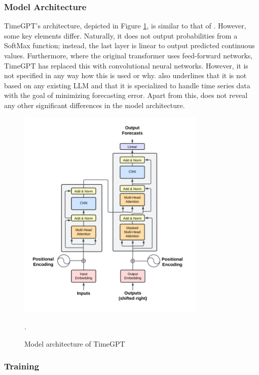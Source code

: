 \documentclass[12pt,a4paper]{article}
\begin{document}
\subsubsection{Model Architecture}

TimeGPT’s architecture, depicted in Figure \ref{timegpt}, is similar to that of \cite{Vaswani2017}. However, some key elements differ. Naturally, it does not output probabilities from a SoftMax function; instead, the last layer is linear to output predicted continuous values. Furthermore, where the original transformer uses feed-forward networks, TimeGPT has replaced this with convolutional neural networks. However, it is not specified in any way how this is used or why. \cite{garza2023timegpt1} also underlines that it is not based on any existing LLM and that it is specialized to handle time series data with the goal of minimizing forecasting error. Apart from this, \cite{garza2023timegpt1} does not reveal any other significant differences in the model architecture.

\begin{figure}[htbp]
  \centering
  \includegraphics[width=0.8\textwidth]{timegpt_fig.png}
  \caption{Model architecture of TimeGPT \parencite{garza2023timegpt1}}.
  \label{timegpt}
\end{figure}

\subsubsection{Training}
\end{document}
